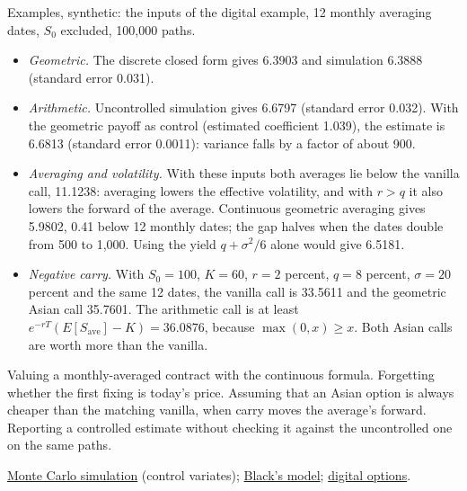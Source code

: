 \begin{qfmethod}
 Examples, synthetic: the inputs of the digital example, 12 monthly averaging dates, $S_0$ excluded, 100{,}000 paths.
\begin{itemize}
\item \emph{Geometric.} The discrete closed form gives 6.3903 and simulation 6.3888 (standard error 0.031).
\item \emph{Arithmetic.} Uncontrolled simulation gives 6.6797 (standard error 0.032). With the geometric payoff as control (estimated coefficient 1.039), the estimate is 6.6813 (standard error 0.0011): variance falls by a factor of about 900.
\item \emph{Averaging and volatility.} With these inputs both averages lie below the vanilla call, 11.1238: averaging lowers the effective volatility, and with $r>q$ it also lowers the forward of the average. Continuous geometric averaging gives 5.9802, 0.41 below 12 monthly dates; the gap halves when the dates double from 500 to 1{,}000. Using the yield $q+\sigma^2/6$ alone would give 6.5181.
\item \emph{Negative carry.} With $S_0=100$, $K=60$, $r=2$ percent, $q=8$ percent, $\sigma=20$ percent and the same 12 dates, the vanilla call is 33.5611 and the geometric Asian call 35.7601. The arithmetic call is at least $e^{-rT}(E[S_{\text{ave}}]-K)=36.0876$, because $\max(0,x)\ge x$. Both Asian calls are worth more than the vanilla.
\end{itemize}

 Valuing a monthly-averaged contract with the continuous formula. Forgetting whether the first fixing is today's price. Assuming that an Asian option is always cheaper than the matching vanilla, when carry moves the average's forward. Reporting a controlled estimate without checking it against the uncontrolled one on the same paths.

 \hyperref[meth:monte-carlo-simulation]{Monte Carlo simulation} (control variates); \hyperref[meth:black-model-rates-currencies]{Black's model}; \hyperref[meth:digital-option-valuation]{digital options}.

\end{qfmethod}
